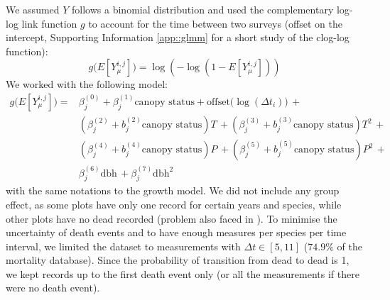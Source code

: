 We assumed $ Y $ follows a binomial distribution and used the complementary log-log link function $ g $ to account for the time between two surveys (offset on the intercept, Supporting Information \ref{app::glmm} for a short study of the clog-log function):
\[
	g \big(E[Y_\mu^{i, j}] \big) = \log \left( -\log(1 - E[Y_\mu^{i, j}]) \right)
\]
We worked with the following model:
\begin{equation}\label{eq::glmm_mortality}
\begin{split}
	g \big(E[Y_\mu^{i, j}] \big) = & \beta_{j}^{(0)}  + \beta_j^{(1)}  \text{canopy status} +
		\text{offset}\big(\log(\Delta t_i) \big) \, + \\
	& \left(\beta_j^{(2)} + b_j^{(2)} \text{canopy status} \right) T \, +
	\left(\beta_j^{(3)} + b_j^{(3)} \text{canopy status} \right) T^2 \, + \\
	& \left(\beta_j^{(4)} + b_j^{(4)} \text{canopy status} \right) P \, +
	\left(\beta_j^{(5)} + b_j^{(5)} \text{canopy status} \right) P^2 \, + \\
	& \beta_j^{(6)} \text{dbh} \, + \beta_j^{(7)} \text{dbh}^2
\end{split}
\end{equation}
with the same notations to the growth model. We did not include any group effect, as some plots have only one record for certain years and species, while other plots have no dead recorded (problem also faced in \citet{Kunstler2019}). To minimise the uncertainty of death events and to have enough measures per species per time interval, we limited the dataset to measurements with $ \Delta t \in [5, 11] $ ($ 74.9 \% $ of the mortality database). Since the probability of transition from dead to dead is 1, we kept records up to the first death event only (or all the measurements if there were no death event). \\

